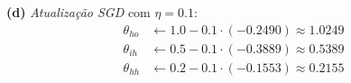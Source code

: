 \documentclass[11pt,a4paper]{article}
\begin{document}
\textbf{(d)} \textit{Atualização SGD} com $\eta = 0.1$:
\begin{align*}
    \theta_{ho} &\leftarrow 1.0 - 0.1\cdot(-0.2490) \approx 1.0249 \\
    \theta_{ih} &\leftarrow 0.5 - 0.1\cdot(-0.3889) \approx 0.5389 \\
    \theta_{hh} &\leftarrow 0.2 - 0.1\cdot(-0.1553) \approx 0.2155
\end{align*}

\color{black}
\end{document}

